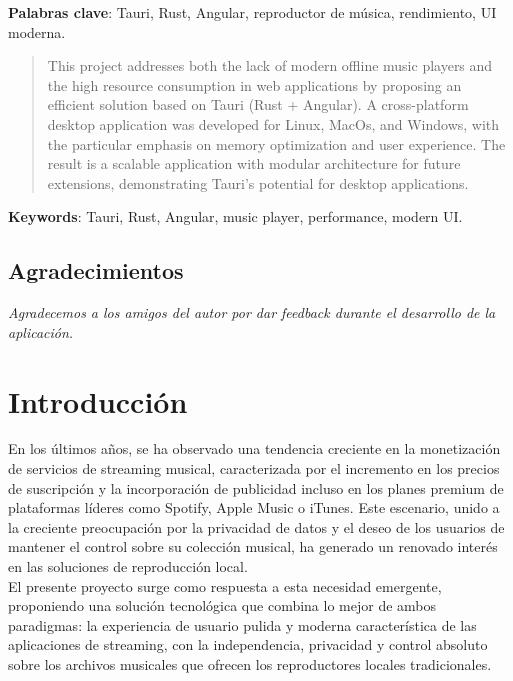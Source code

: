 \documentclass[11pt, a4paper]{article}
\begin{document}
\noindent \textbf{Palabras clave}: Tauri, Rust, Angular, reproductor de música, rendimiento, UI moderna.

\begin{abstract}
    This project addresses both the lack of modern offline music players and the high resource consumption in web applications by proposing an efficient solution based on Tauri (Rust + Angular). A cross-platform desktop application was developed for Linux, MacOs, and Windows, with the particular emphasis on memory optimization and user experience. The result is a scalable application with modular architecture for future extensions, demonstrating Tauri's potential for desktop applications.
\end{abstract}

\noindent \textbf{Keywords}: Tauri, Rust, Angular, music player, performance, modern UI.


\begin{center}
  \section*{Agradecimientos}

  \textit{Agradecemos a los amigos del autor por dar feedback durante el desarrollo de la aplicación.}
\end{center}


\clearpage

\tableofcontents
\listoffigures
\listoftables
\lstlistoflistings


\clearpage


\setcounter{page}{1}
\section{Introducción}

En los últimos años, se ha observado una tendencia creciente en la monetización de servicios de streaming musical, caracterizada por el incremento en los precios de suscripción y la incorporación de publicidad incluso en los planes premium de plataformas líderes como Spotify, Apple Music o iTunes. Este escenario, unido a la creciente preocupación por la privacidad de datos y el deseo de los usuarios de mantener el control sobre su colección musical, ha generado un renovado interés en las soluciones de reproducción local. \\

El presente proyecto surge como respuesta a esta necesidad emergente, proponiendo una solución tecnológica que combina lo mejor de ambos paradigmas: la experiencia de usuario pulida y moderna característica de las aplicaciones de streaming, con la independencia, privacidad y control absoluto sobre los archivos musicales que ofrecen los reproductores locales tradicionales. \\
\end{document}
